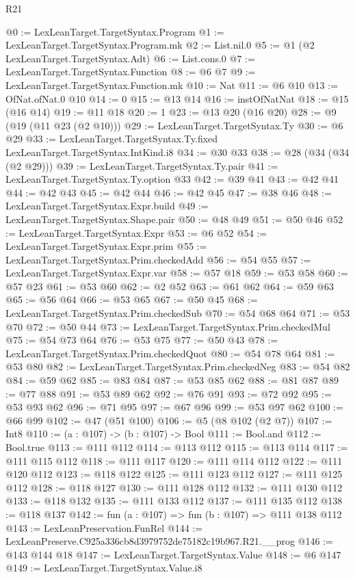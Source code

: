 \begin{lexlean}{R21}
\begin{coremodule}
@0 := LexLeanTarget.TargetSyntax.Program
@1 := LexLeanTarget.TargetSyntax.Program.mk
@2 := List.nil.{0}
@5 := @1 (@2 LexLeanTarget.TargetSyntax.Adt)
@6 := List.cons.{0}
@7 := LexLeanTarget.TargetSyntax.Function
@8 := @6 @7
@9 := LexLeanTarget.TargetSyntax.Function.mk
@10 := Nat
@11 := @6 @10
@13 := OfNat.ofNat.{0} @10
@14 := 0
@15 := @13 @14
@16 := instOfNatNat
@18 := @15 (@16 @14)
@19 := @11 @18
@20 := 1
@23 := @13 @20 (@16 @20)
@28 := @9 (@19 (@11 @23 (@2 @10)))
@29 := LexLeanTarget.TargetSyntax.Ty
@30 := @6 @29
@33 := LexLeanTarget.TargetSyntax.Ty.fixed LexLeanTarget.TargetSyntax.IntKind.i8
@34 := @30 @33
@38 := @28 (@34 (@34 (@2 @29)))
@39 := LexLeanTarget.TargetSyntax.Ty.pair
@41 := LexLeanTarget.TargetSyntax.Ty.option @33
@42 := @39 @41
@43 := @42 @41
@44 := @42 @43
@45 := @42 @44
@46 := @42 @45
@47 := @38 @46
@48 := LexLeanTarget.TargetSyntax.Expr.build
@49 := LexLeanTarget.TargetSyntax.Shape.pair
@50 := @48 @49
@51 := @50 @46
@52 := LexLeanTarget.TargetSyntax.Expr
@53 := @6 @52
@54 := LexLeanTarget.TargetSyntax.Expr.prim
@55 := LexLeanTarget.TargetSyntax.Prim.checkedAdd
@56 := @54 @55
@57 := LexLeanTarget.TargetSyntax.Expr.var
@58 := @57 @18
@59 := @53 @58
@60 := @57 @23
@61 := @53 @60
@62 := @2 @52
@63 := @61 @62
@64 := @59 @63
@65 := @56 @64
@66 := @53 @65
@67 := @50 @45
@68 := LexLeanTarget.TargetSyntax.Prim.checkedSub
@70 := @54 @68 @64
@71 := @53 @70
@72 := @50 @44
@73 := LexLeanTarget.TargetSyntax.Prim.checkedMul
@75 := @54 @73 @64
@76 := @53 @75
@77 := @50 @43
@78 := LexLeanTarget.TargetSyntax.Prim.checkedQuot
@80 := @54 @78 @64
@81 := @53 @80
@82 := LexLeanTarget.TargetSyntax.Prim.checkedNeg
@83 := @54 @82
@84 := @59 @62
@85 := @83 @84
@87 := @53 @85 @62
@88 := @81 @87
@89 := @77 @88
@91 := @53 @89 @62
@92 := @76 @91
@93 := @72 @92
@95 := @53 @93 @62
@96 := @71 @95
@97 := @67 @96
@99 := @53 @97 @62
@100 := @66 @99
@102 := @47 (@51 @100)
@106 := @5 (@8 @102 (@2 @7))
@107 := Int8
@110 := (a : @107) -> (b : @107) -> Bool
@111 := Bool.and
@112 := Bool.true
@113 := @111 @112
@114 := @113 @112
@115 := @113 @114
@117 := @111 @115 @112
@118 := @111 @117
@120 := @111 @114 @112
@122 := @111 @120 @112
@123 := @118 @122
@125 := @111 @123 @112
@127 := @111 @125 @112
@128 := @118 @127
@130 := @111 @128 @112
@132 := @111 @130 @112
@133 := @118 @132
@135 := @111 @133 @112
@137 := @111 @135 @112
@138 := @118 @137
@142 := fun (a : @107) => fun (b : @107) => @111 @138 @112
@143 := LexLeanPreservation.FunRel
@144 := LexLeanPreserve.C925a336cb8d3979752de75182c19b967.R21.__prog
@146 := @143 @144 @18
@147 := LexLeanTarget.TargetSyntax.Value
@148 := @6 @147
@149 := LexLeanTarget.TargetSyntax.Value.i8

\end{coremodule}
\end{lexlean}
